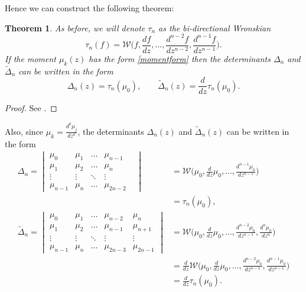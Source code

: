 \documentclass[12pt]{article}
\def\w{Wronskian }
\def\W{\mathcal{W}}
\newtheorem{mydef}{Theorem}[section]
\numberwithin{figure}{section}
\numberwithin{equation}{section}
\numberwithin{table}{section}
\begin{document}
Hence we can construct the following theorem:
\begin{mydef}\label{mo:2}
As before, we will denote $\tau_n$ as the bi-directional \w
\begin{equation}
\tau_n(f)=\W\bigg(f,\frac{df}{dz},...,\frac{d^{n-2}f}{dz^{n-2}},\frac{d^{n-1}f}{dz^{n-1}}\bigg).\label{Wronskian}
\end{equation}
If the moment $\mu_k(z)$ has the form \eqref{momentform} then the determinants $\Delta_n$ and $\widetilde\Delta_n$ can be
written in the form
\begin{equation}\label{dd}
\Delta_n(z)=\tau_n(\mu_0),\qquad\widetilde\Delta_n(z)=\frac{d}{dz}\tau_n(\mu_0).
\end{equation}
\end{mydef}
\begin{proof}
See \cite{Rec,P:44:291,P:30:305,P:62:1887}.
\end{proof}
Also, since $\mu_k=\frac{d^k\mu_j}{dz^k}$, the determinants $\Delta_n(z)$ and $\widetilde\Delta_n(z)$ can be written in the form
\begin{align*}
\Delta_n=\begin{vmatrix}
\mu_{0} & \mu_1  &\hdots& \mu_{n-1} \\
\mu_1 & \mu_2  &\hdots& \mu_n  \\
\vdots  &\vdots & \ddots &\vdots & \\
\mu_{n-1} & \mu_n  &\hdots& \mu_{2n-2}
\end{vmatrix}&=\mathcal{W}\bigg(\mu_0,\frac{d}{dz}\mu_0,...,\frac{d^{n-1}\mu_0}{dz^{n-1}}\bigg)\\
&=\tau_n(\mu_0),\\
\widetilde\Delta_n=\begin{vmatrix}
\mu_{0} & \mu_1  &\hdots& \mu_{n-2} & \mu_{n} \\
\mu_1 & \mu_2  &\hdots& \mu_{n-1} & \mu_{n+1}  \\
\vdots &\vdots  & \ddots & \vdots &\vdots \\
\mu_{n-1} & \mu_n  &\hdots& \mu_{2n-3} & \mu_{2n-1}
\end{vmatrix}&=\mathcal{W}\bigg(\mu_0,\frac{d}{dz}\mu_0,...,\frac{d^{n-2}\mu_0}{dz^{n-1}},\frac{d^{n}\mu_0}{dz^{n}}\bigg)\\
&=\frac{d}{dz}\mathcal{W}\bigg(\mu_0,\frac{d}{dz}\mu_0,...,\frac{d^{n-2}\mu_0}{dz^{n-1}},\frac{d^{n-1}\mu_0}{dz^{n-1}}\bigg)\\
&=\frac{d}{dz}\tau_n(\mu_0).
 \label{delta}
\end{align*}
\end{document}
